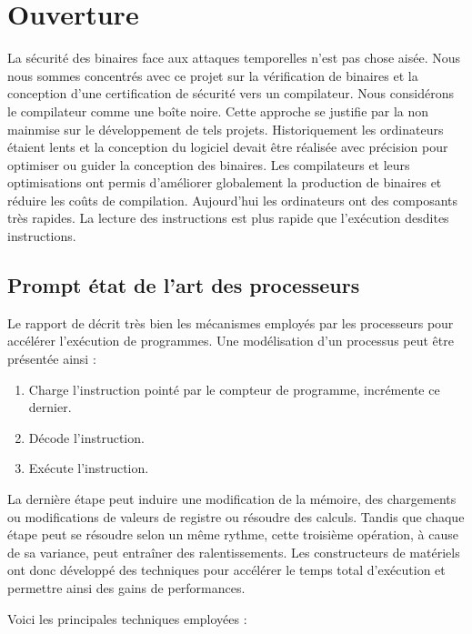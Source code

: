 \section*{Ouverture}

La sécurité des binaires face aux attaques temporelles n'est pas chose aisée. Nous nous sommes concentrés avec ce projet sur la vérification de binaires et la conception d'une certification de sécurité vers un compilateur. Nous considérons le compilateur comme une boîte noire. Cette approche se justifie par la non mainmise sur le développement de tels projets. Historiquement les ordinateurs étaient lents et la conception du logiciel devait être réalisée avec précision pour optimiser ou guider la conception des binaires. Les compilateurs et leurs optimisations ont permis d'améliorer globalement la production de binaires et réduire les coûts de compilation. Aujourd'hui les ordinateurs ont des composants très rapides. La lecture des instructions est plus rapide que l'exécution desdites instructions.\smallbreak

\subsection*{Prompt état de l'art des processeurs}

Le rapport de \citeauthor{constantTimePornin} \cite{constantTimePornin} décrit très bien les mécanismes employés par les processeurs pour accélérer l'exécution de programmes. Une modélisation d'un processus peut être présentée ainsi :
\begin{enumerate}
    \item Charge l'instruction pointé par le compteur de programme, incrémente ce dernier.
    \item Décode l'instruction.
    \item Exécute l'instruction.
\end{enumerate}

La dernière étape peut induire une modification de la mémoire, des chargements ou modifications de valeurs de registre ou résoudre des calculs. Tandis que chaque étape peut se résoudre selon un même rythme, cette troisième opération, à cause de sa variance, peut entraîner des ralentissements. Les constructeurs de matériels ont donc développé des techniques pour accélérer le temps total d'exécution et permettre ainsi des gains de performances. \smallbreak

Voici les principales techniques employées :

